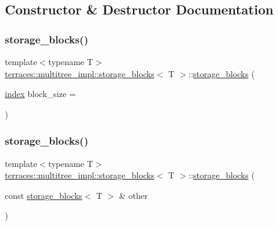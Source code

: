 \subsection{Constructor \& Destructor Documentation}
\mbox{\label{classterraces_1_1multitree__impl_1_1storage__blocks_addbab5fd5bbfd28586b02b27eb496609}} 
\subsubsection{\texorpdfstring{storage\+\_\+blocks()}{storage\_blocks()}\hspace{0.1cm}{\footnotesize\ttfamily [1/3]}}
{\footnotesize\ttfamily template$<$typename T$>$ \\
\hyperlink{classterraces_1_1multitree__impl_1_1storage__blocks}{terraces\+::multitree\+\_\+impl\+::storage\+\_\+blocks}$<$ T $>$\+::\hyperlink{classterraces_1_1multitree__impl_1_1storage__blocks}{storage\+\_\+blocks} (\begin{DoxyParamCaption}\item[{\hyperlink{namespaceterraces_adbc33ccb543d1634e96d0eb02e472c77}{index}}]{block\+\_\+size = {} }\end{DoxyParamCaption})\hspace{0.3cm}{\ttfamily [inline]}}

\mbox{\label{classterraces_1_1multitree__impl_1_1storage__blocks_a1789287b99036f79ba623fb3e7e73b58}} 
\subsubsection{\texorpdfstring{storage\+\_\+blocks()}{storage\_blocks()}\hspace{0.1cm}{\footnotesize\ttfamily [2/3]}}
{\footnotesize\ttfamily template$<$typename T$>$ \\
\hyperlink{classterraces_1_1multitree__impl_1_1storage__blocks}{terraces\+::multitree\+\_\+impl\+::storage\+\_\+blocks}$<$ T $>$\+::\hyperlink{classterraces_1_1multitree__impl_1_1storage__blocks}{storage\+\_\+blocks} (\begin{DoxyParamCaption}\item[{const \hyperlink{classterraces_1_1multitree__impl_1_1storage__blocks}{storage\+\_\+blocks}$<$ T $>$ \&}]{other }\end{DoxyParamCaption})\hspace{0.3cm}{\ttfamily [inline]}}


